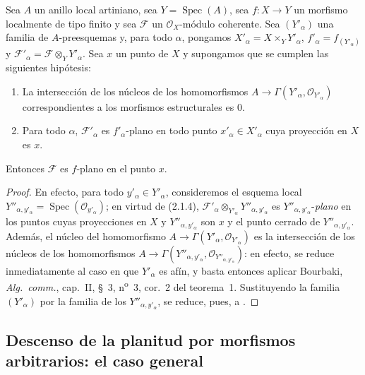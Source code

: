 \begin{corollary}[11.4.13]
\label{IV.11.4.13}
Sea $A$ un anillo local artiniano, sea $Y=\operatorname{Spec}(A)$, sea $f:X\to Y$ un
morfismo localmente de tipo finito y sea $\mathcal F$ un $\mathcal O_X$-módulo coherente. Sea $(Y'_\alpha)$ una familia de
$A$-preesquemas y, para todo $\alpha$, pongamos $X'_\alpha=X\times_Y Y'_\alpha$, $f'_\alpha=f_{(Y'_\alpha)}$ y $\mathcal F'_\alpha=\mathcal F\otimes_Y Y'_\alpha$. Sea $x$ un punto
de $X$ y supongamos que se cumplen las siguientes hipótesis:
\begin{enumerate}[label=\textup{(\roman*)}]
  \item La intersección de los núcleos de los homomorfismos $A\to\Gamma(Y'_\alpha,\mathcal O_{Y'_\alpha})$ correspondientes a los
  morfismos estructurales es $0$.
  \item Para todo $\alpha$, $\mathcal F'_\alpha$ es $f'_\alpha$-plano en \textup{todo} punto $x'_\alpha\in X'_\alpha$ cuya proyección en $X$ es $x$.
\end{enumerate}

Entonces $\mathcal F$ es $f$-plano en el punto $x$.
\end{corollary}

\begin{proof}
En efecto, para todo $y'_\alpha\in Y'_\alpha$, consideremos el esquema local
$Y''_{\alpha,y'_\alpha}=\operatorname{Spec}(\mathcal O_{y'_\alpha})$; en
virtud de (2.1.4), $\mathcal F'_\alpha\otimes_{Y'_\alpha}Y''_{\alpha,y'_\alpha}$ es
$Y''_{\alpha,y'_\alpha}$-\emph{plano} en los puntos cuyas proyecciones en $X$ y
$Y''_{\alpha,y'_\alpha}$ son $x$ y el punto cerrado de $Y''_{\alpha,y'_\alpha}$.
Además, el núcleo del homomorfismo
$A\to\Gamma(Y'_\alpha,\mathcal O_{Y'_\alpha})$ es la intersección de los núcleos de los homomorfismos
$A\to\Gamma(Y''_{\alpha,y'_\alpha},\mathcal O_{Y''_{\alpha,y'_\alpha}})$:
en efecto, se reduce inmediatamente al caso en que $Y'_\alpha$ es afín, y basta entonces aplicar Bourbaki, \emph{Alg.\ comm.},
cap.~II, \S~3, n\textsuperscript{o}~3, cor.~2 del teorema~1. Sustituyendo la familia $(Y'_\alpha)$ por la familia de los $Y''_{\alpha,y'_\alpha}$,
se reduce, pues, a .
\end{proof}

\subsection{Descenso de la planitud por morfismos arbitrarios: el caso general}
\label{subsection:IV.11.5}

